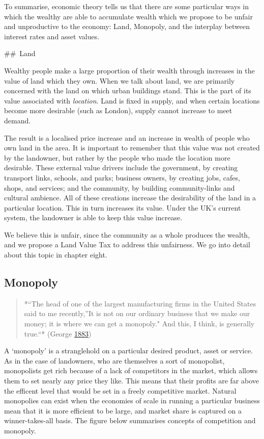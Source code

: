 \documentclass[]{tufte-handout}
\begin{document}
To summarise, economic theory tells us that there are some particular
ways in which the wealthy are able to accumulate wealth which we propose
to be unfair and unproductive to the economy: Land, Monopoly, and the
interplay between interest rates and asset values.

\#\#~Land

Wealthy people make a large proportion of their wealth through increases
in the value of land which they own. When we talk about land, we are
primarily concerned with the land on which urban buildings stand. This
is the part of its value associated with \emph{location}. Land is fixed
in supply, and when certain locations become more desirable (such as
London), supply cannot increase to meet demand.

The result is a localised price increase and an increase in wealth of
people who own land in the area. It is important to remember that this
value was not created by the landowner, but rather by the people who
made the location more desirable. These external value drivers include
the government, by creating transport links, schools, and parks;
business owners, by creating jobs, cafes, shops, and services; and the
community, by building community-links and cultural ambience. All of
these creations increase the desirability of the land in a particular
location. This in turn increases its value. Under the UK's current
system, the landowner is able to keep this value increase.

We believe this is unfair, since the community as a whole produces the
wealth, and we propose a Land Value Tax to address this unfairness. We
go into detail about this topic in chapter eight.

\hypertarget{monopoly}{%
\subsection{Monopoly}\label{monopoly}}

\begin{quote}
*``The head of one of the largest manufacturing firms in the United
States said to me recently,''It is not on our ordinary business that we
make our money; it is where we can get a monopoly." And this, I think,
is generally true.``* (George \protect\hyperlink{ref-George}{1883})
\end{quote}

A `monopoly' is a stranglehold on a particular desired product, asset or
service. As in the case of landowners, who are themselves a sort of
monopolist, monopolists get rich because of a lack of competitors in the
market, which allows them to set nearly any price they like. This means
that their profits are far above the efficent level that would be set in
a freely competitive market. Natural monopolies can exist when the
economies of scale in running a particular business mean that it is more
efficient to be large, and market share is captured on a
winner-takes-all basis. The figure below summarises concepts of
competition and monopoly.
\end{document}
